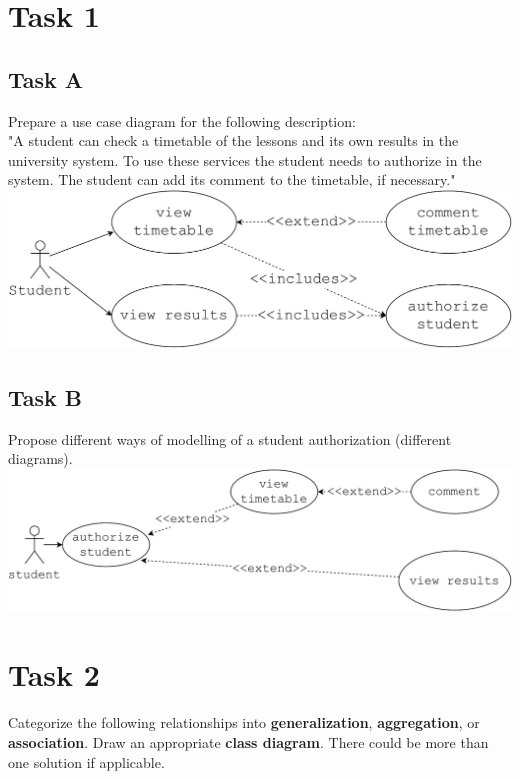 \documentclass[12pt]{article}
\begin{document}
\section{Task 1}

\subsection{Task A}
Prepare a use case diagram for the following description:  \\

"A student can check a timetable of the lessons and its own results in the university system.  To use these services the student needs to authorize in the system. The student can add its comment to the timetable, if necessary." 
\\
\includegraphics[width=\textwidth]{1A}

\subsection{Task B}
Propose different ways of modelling of a student authorization (different diagrams).  \\ 
\includegraphics[width=\textwidth]{1B}


\newpage
\section{Task 2}
Categorize the following relationships into \textbf{generalization},  \textbf{aggregation}, or  \textbf{association}. Draw an appropriate  \textbf{class diagram}. There could be more than one solution if applicable. 
\end{document}
